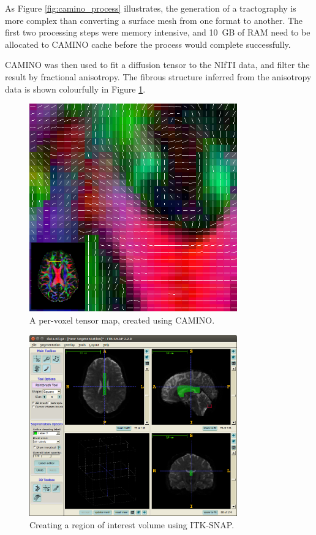 \documentclass[MSc,paper=a4,pagesize=auto]{icldt}
\begin{document}
As Figure \ref{fig:camino_process} illustrates, the generation of a tractography is more complex than converting a surface mesh from one format to another. The first two processing steps were memory intensive, and \SI{10}{GB} of RAM need to be allocated to CAMINO cache before the process would complete successfully. 

CAMINO was then used to fit a diffusion tensor to the NIfTI data, and filter the result by fractional anisotropy. The fibrous structure inferred from the anisotropy data is shown colourfully in Figure \ref{fig:CAMINO_tensors}. 

\begin{figure}[htbp!]
    \centering
    \includegraphics[width=0.8\textwidth]{resources/CAMINO_tensors}
    \caption{A per-voxel tensor map, created using CAMINO.}
    \label{fig:CAMINO_tensors}
\end{figure}


\begin{figure}[htbp!]
    \centering
    \includegraphics[width=0.8\textwidth]{resources/CAMINO_roi_selection}
    \caption{Creating a region of interest volume using ITK-SNAP.}
    \label{fig:CAMINO_roi_selection}
\end{figure}
\end{document}
